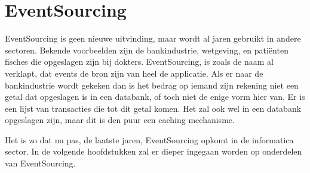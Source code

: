 
\chapter{EventSourcing}
\label{ch:eventsourcing}

EventSourcing is geen nieuwe uitvinding, maar wordt al jaren gebruikt in andere sectoren. Bekende voorbeelden zijn de bankindustrie, wetgeving, en patiënten fisches die opgeslagen zijn bij dokters. EventSourcing, is zoals de naam al verklapt, dat events de bron zijn van heel de applicatie. Als er naar de bankindustrie wordt gekeken dan is het bedrag op iemand zijn rekening niet een getal dat opgeslagen is in een databank, of toch niet de enige vorm hier van. Er is een lijst van transacties die tot dit getal komen. Het zal ook wel in een databank opgeslagen zijn, maar dit is den puur een caching mechanisme.

Het is zo dat nu pas, de laatste jaren, EventSourcing opkomt in de informatica sector. In de volgende hoofdstukken zal er dieper ingegaan worden op onderdelen van EventSourcing.